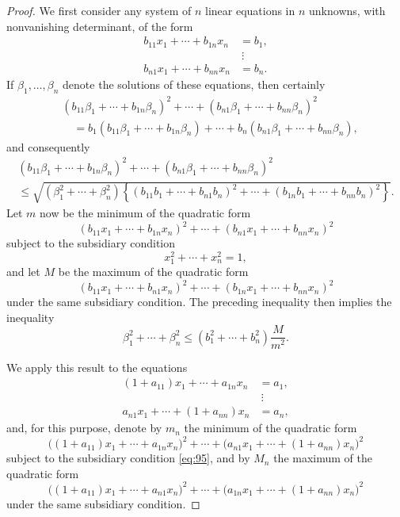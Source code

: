 \documentclass[b5paper,twoside]{article}
\newcommand{\originalpage}[1]{\phantomsection\label{origpage:#1}}
\begin{document}
\begin{proof}
We first consider any system of $n$ linear equations in $n$ unknowns, with
nonvanishing determinant, of the form
\begin{align*}
  b_{11}x_1+\cdots+b_{1n}x_n&=b_1,\\
  &\ \vdots\\
  b_{n1}x_1+\cdots+b_{nn}x_n&=b_n.
\end{align*}
If $\beta_1,\ldots,\beta_n$ denote the solutions of these equations, then
certainly
\begin{align*}
 &(b_{11}\beta_1+\cdots+b_{1n}\beta_n)^2+\cdots
 +(b_{n1}\beta_1+\cdots+b_{nn}\beta_n)^2\\
 &\quad=b_1(b_{11}\beta_1+\cdots+b_{1n}\beta_n)+\cdots
 +b_n(b_{n1}\beta_1+\cdots+b_{nn}\beta_n),
\end{align*}
and consequently
\begin{multline*}
 (b_{11}\beta_1+\cdots+b_{1n}\beta_n)^2+\cdots
 +(b_{n1}\beta_1+\cdots+b_{nn}\beta_n)^2\\
 \leq\sqrt{(\beta_1^2+\cdots+\beta_n^2)
 \left\{
 (b_{11}b_1+\cdots+b_{n1}b_n)^2+\cdots
 +(b_{1n}b_1+\cdots+b_{nn}b_n)^2
 \right\}}.
\end{multline*}
Let $m$ now be the minimum of the quadratic form
\[
  (b_{11}x_1+\cdots+b_{1n}x_n)^2+\cdots
  +(b_{n1}x_1+\cdots+b_{nn}x_n)^2
\]
subject to the subsidiary condition
\begin{equation}
  x_1^2+\cdots+x_n^2=1,
  \tag{95}\label{eq:95}
\end{equation}
\originalpage{220}
and let $M$ be the maximum of the quadratic form
\[
  (b_{11}x_1+\cdots+b_{n1}x_n)^2+\cdots
  +(b_{1n}x_1+\cdots+b_{nn}x_n)^2
\]
under the same subsidiary condition. The preceding inequality then implies
the inequality
\begin{equation}
  \beta_1^2+\cdots+\beta_n^2
  \leq(b_1^2+\cdots+b_n^2)\frac{M}{m^2}.
  \tag{96}\label{eq:96}
\end{equation}

We apply this result to the equations
\begin{equation}
  \begin{aligned}
    (1+a_{11})x_1+\cdots+a_{1n}x_n&=a_1,\\
    &\ \vdots\\
    a_{n1}x_1+\cdots+(1+a_{nn})x_n&=a_n,
  \end{aligned}
  \tag{97}\label{eq:97}
\end{equation}
and, for this purpose, denote by $m_n$ the minimum of the quadratic form
\[
  \bigl((1+a_{11})x_1+\cdots+a_{1n}x_n\bigr)^2+\cdots
  +\bigl(a_{n1}x_1+\cdots+(1+a_{nn})x_n\bigr)^2
\]
subject to the subsidiary condition \eqref{eq:95}, and by $M_n$ the maximum
of the quadratic form
\[
  \bigl((1+a_{11})x_1+\cdots+a_{n1}x_n\bigr)^2+\cdots
  +\bigl(a_{1n}x_1+\cdots+(1+a_{nn})x_n\bigr)^2
\]
under the same subsidiary condition.


\end{proof}
\end{document}
